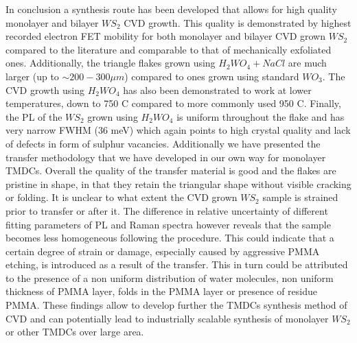 In conclusion a synthesis route has been developed that allows for high quality monolayer and bilayer $WS_2$ CVD growth. This quality is demonstrated by highest recorded electron FET mobility for both monolayer and bilayer CVD grown $WS_2$ compared to the literature and comparable to that of mechanically exfoliated ones. Additionally, the triangle flakes grown using $H_2WO_4 + NaCl$ are much larger (up to $\sim 200-300 {\mu}m$) compared to ones grown using standard $WO_3$. The CVD growth using $H_2WO_4$ has also been demonstrated to work at lower temperatures, down to 750 {\degree}C compared to more commonly used 950 {\degree}C. Finally, the PL of the $WS_2$ grown using $H_2WO_4$ is uniform throughout the flake and has very narrow FWHM (36 meV) which again points to high crystal quality and lack of defects in form of sulphur vacancies. Additionally we have presented the transfer methodology that we have developed in our own way for monolayer TMDCs. Overall the quality of the transfer material is good and the flakes are pristine in shape, in that they retain the triangular shape without visible cracking or folding. It is unclear to what extent the CVD grown $WS_2$ sample is strained prior to transfer or after it. The difference in relative uncertainty of different fitting parameters of PL and Raman spectra however reveals that the sample becomes less homogeneous following the procedure. This could indicate that a certain degree of strain or damage, especially caused by aggressive PMMA etching, is introduced as a result of the transfer. This in turn could be attributed to the presence of a non uniform distribution of water molecules, non uniform thickness of PMMA layer, folds in the PMMA layer or presence of residue PMMA. These findings allow to develop further the TMDCs synthesis method of CVD and can potentially lead to industrially scalable synthesis of monolayer $WS_2$ or other TMDCs over large area.